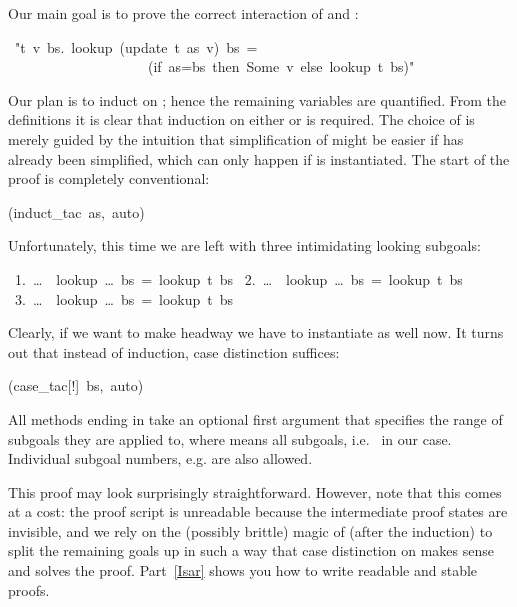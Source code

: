 \begin{isabelle}
\begin{isamarkuptext}
Our main goal is to prove the correct interaction of  and
:%
\end{isamarkuptext}%
\ {"}{\isasymforall}t\ v\ bs.\ lookup\ (update\ t\ as\ v)\ bs\ =\isanewline
\ \ \ \ \ \ \ \ \ \ \ \ \ \ \ \ \ \ \ \ (if\ as=bs\ then\ Some\ v\ else\ lookup\ t\ bs){"}%
\begin{isamarkuptxt}%
\noindent
Our plan is to induct on ; hence the remaining variables are
quantified. From the definitions it is clear that induction on either
 or  is required. The choice of  is merely
guided by the intuition that simplification of  might be easier
if  has already been simplified, which can only happen if
 is instantiated.
The start of the proof is completely conventional:%
\end{isamarkuptxt}%
(induct\_tac\ as,\ auto)%
\begin{isamarkuptxt}%
\noindent
Unfortunately, this time we are left with three intimidating looking subgoals:
\begin{isabellepar}%
~1.~\dots~{\isasymLongrightarrow}~lookup~\dots~bs~=~lookup~t~bs\isanewline
~2.~\dots~{\isasymLongrightarrow}~lookup~\dots~bs~=~lookup~t~bs\isanewline
~3.~\dots~{\isasymLongrightarrow}~lookup~\dots~bs~=~lookup~t~bs%
\end{isabellepar}%
Clearly, if we want to make headway we have to instantiate  as
well now. It turns out that instead of induction, case distinction
suffices:%
\end{isamarkuptxt}%
(case\_tac[!]\ bs,\ auto)%
\begin{isamarkuptext}%
\noindent
All methods ending in  take an optional first argument that
specifies the range of subgoals they are applied to, where \isa{[!]} means all
subgoals, i.e.\ \isa{[1-3]} in our case. Individual subgoal numbers,
e.g. \isa{[2]} are also allowed.

This proof may look surprisingly straightforward. However, note that this
comes at a cost: the proof script is unreadable because the
intermediate proof states are invisible, and we rely on the (possibly
brittle) magic of  (after the induction) to split the remaining
goals up in such a way that case distinction on  makes sense and
solves the proof. Part~\ref{Isar} shows you how to write readable and stable
proofs.%
\end{isamarkuptext}%
\end{isabelle}%
